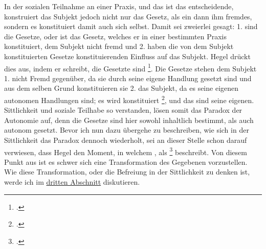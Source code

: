 \documentclass[12pt, a4paper, openany]{report}
\begin{document}
In der sozialen Teilnahme an einer Praxis, und das ist das entscheidende, konstruiert das Subjekt jedoch nicht nur das Gesetz, als ein dann ihm fremdes, sondern es konstituiert damit auch sich selbst. 
Damit sei zweierlei gesagt: 1. sind die Gesetze, oder ist das Gesetz, welches er in einer bestimmten Praxis konstituiert, dem Subjekt nicht fremd und 2. haben die von dem Subjekt konstituierten Gesetze konstituierenden Einfluss auf das Subjekt. 
Hegel drückt dies aus, indem er schreibt, die Gesetzte sind \footcite[][§147, S. 162.]{hegel_grundlinien_2017}.
Die Gesetze stehen dem Subjekt 1. nicht Fremd gegenüber, da sie durch seine eigene Handlung gesetzt sind und aus dem selben Grund konstituieren sie 2. das Subjekt, da es seine eigenen autonomen Handlungen sind;
es wird konstituiert \footcite[][30]{menke_autonomie_2018}, und das sind seine eigenen.
Sittlichkeit und soziale Teilhabe so verstanden, lösen somit das Paradox der Autonomie auf, denn die Gesetze sind hier sowohl inhaltlich bestimmt, als auch autonom gesetzt.
Bevor ich nun dazu übergehe zu beschreiben, wie sich in der Sittlichkeit das Paradox dennoch wiederholt, sei an dieser Stelle schon darauf verwiesen, dass Hegel den Moment, in welchem , als \footcite[][§147, S. 163.]{hegel_grundlinien_2017} beschreibt. 
Von diesem Punkt aus ist es schwer sich eine Transformation des Gegebenen vorzustellen.
Wie diese Transformation, oder die Befreiung in der Sittlichkeit zu denken ist, werde ich im \hyperref[abschnitt_3]{dritten Abschnitt} diskutieren.
\end{document}
